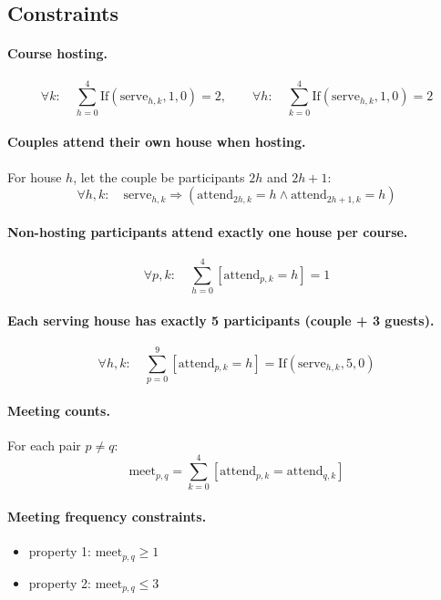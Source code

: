 \documentclass{article}
\begin{document}
\subsection{Constraints}

\paragraph{Course hosting.}
\[
\forall k:\quad \sum_{h=0}^{4} \text{If}(\text{serve}_{h,k}, 1, 0) = 2, \qquad
\forall h:\quad \sum_{k=0}^{4} \text{If}(\text{serve}_{h,k}, 1, 0) = 2
\]

\paragraph{Couples attend their own house when hosting.}  
For house $h$, let the couple be participants $2h$ and $2h+1$:
\[
\forall h,k:\quad \text{serve}_{h,k} \Rightarrow (\text{attend}_{2h,k}=h \wedge \text{attend}_{2h+1,k}=h)
\]

\paragraph{Non-hosting participants attend exactly one house per course.}
\[
\forall p,k:\quad \sum_{h=0}^{4} [\text{attend}_{p,k} = h] = 1
\]

\paragraph{Each serving house has exactly 5 participants (couple + 3 guests).}
\[
\forall h,k:\quad \sum_{p=0}^{9} [\text{attend}_{p,k} = h] = \text{If}(\text{serve}_{h,k}, 5, 0)
\]

\paragraph{Meeting counts.}  
For each pair $p \neq q$:
\[
\text{meet}_{p,q} = \sum_{k=0}^{4} [\text{attend}_{p,k} = \text{attend}_{q,k}]
\]

\paragraph{Meeting frequency constraints.}
\begin{itemize}
    \item property 1: $\text{meet}_{p,q} \ge 1$
    \item property 2: $\text{meet}_{p,q} \le 3$
\end{itemize}
\end{document}
